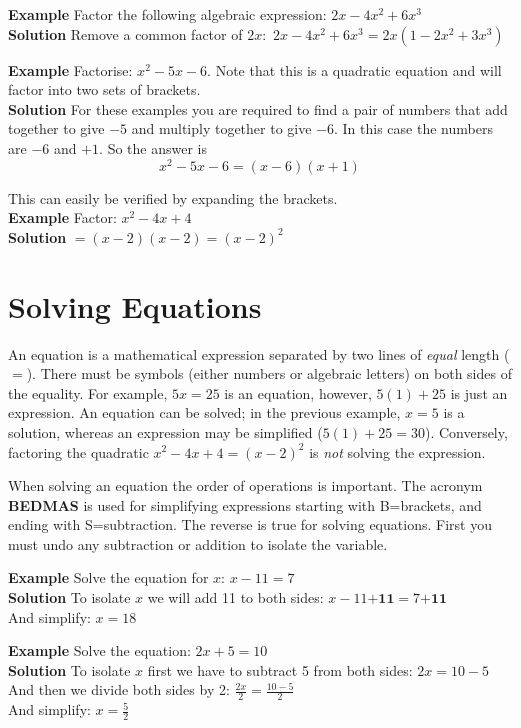 \textbf{Example} Factor the following algebraic expression: $2x-4x^2+6x^3$\\
\textbf{Solution} Remove a common factor of $2x$: $\,2x-4x^2+6x^3=2x(1-2x^2+3x^3)$

\textbf{Example}
Factorise: $x^{2} -5 x -6$. Note that this is a quadratic equation and will factor into two sets of brackets.\\
\textbf{Solution} For these examples you are required to find a pair of numbers that add together to give $ -5$ and multiply together to give $ -6$. In this case the numbers are $ -6$ and $ +1$. So the answer is
\begin{equation*}x^{2} -5 x -6 =\left (x -6\right ) \left (x +1\right )
\end{equation*}

This can easily be verified by expanding the brackets.\\

\textbf{Example} Factor: $x^2-4x+4$\\
\textbf{Solution} $=(x-2)(x-2)=(x-2)^2$

\section*{Solving Equations}
An equation is a mathematical expression separated by two lines of \textit{equal} length ($=$). There must be symbols (either numbers or algebraic letters) on both sides of the equality. For example, $5x=25$ is an equation, however, $5(1)+25$ is just an expression. An equation can be solved; in the previous example, $x=5$ is a solution, whereas an expression may be simplified ($5(1)+25=30$). Conversely, factoring the quadratic $x^2-4x+4=(x-2)^2$ is \textit{not} solving the expression.

When solving an equation the order of operations is important. The acronym \textbf{BEDMAS} is used for simplifying expressions starting with B=brackets, and ending with S=subtraction. The reverse is true for solving equations. First you must undo any subtraction or addition to isolate the variable.

\textbf{Example} Solve the equation for $x$: $x-11=7$\\
\textbf{Solution} To isolate $x$ we will add 11 to both sides: $x-11\textbf{+11}=7\textbf{+11}$\\
And simplify: $x=18$

\textbf{Example} Solve the equation: $2x+5=10$\\
\textbf{Solution} To isolate $x$ first we have to subtract 5 from both sides: $2x=10-5$\\
And then we divide both sides by 2: $\frac{2x}{2}=\frac{10-5}{2}$\\
And simplify: $x=\frac{5}{2}$

